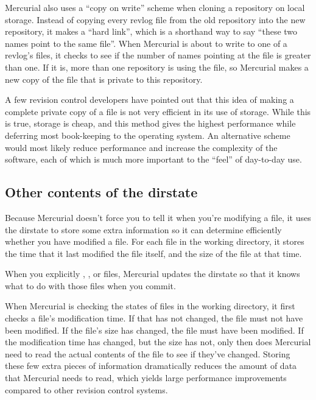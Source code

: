 Mercurial also uses a ``copy on write'' scheme when cloning a
repository on local storage.  Instead of copying every revlog file
from the old repository into the new repository, it makes a ``hard
link'', which is a shorthand way to say ``these two names point to the
same file''.  When Mercurial is about to write to one of a revlog's
files, it checks to see if the number of names pointing at the file is
greater than one.  If it is, more than one repository is using the
file, so Mercurial makes a new copy of the file that is private to
this repository.

A few revision control developers have pointed out that this idea of
making a complete private copy of a file is not very efficient in its
use of storage.  While this is true, storage is cheap, and this method
gives the highest performance while deferring most book-keeping to the
operating system.  An alternative scheme would most likely reduce
performance and increase the complexity of the software, each of which
is much more important to the ``feel'' of day-to-day use.

\subsection{Other contents of the dirstate}

Because Mercurial doesn't force you to tell it when you're modifying a
file, it uses the dirstate to store some extra information so it can
determine efficiently whether you have modified a file.  For each file
in the working directory, it stores the time that it last modified the
file itself, and the size of the file at that time.  

When you explicitly , ,  or
 files, Mercurial updates the dirstate so that it knows
what to do with those files when you commit.

When Mercurial is checking the states of files in the working
directory, it first checks a file's modification time.  If that has
not changed, the file must not have been modified.  If the file's size
has changed, the file must have been modified.  If the modification
time has changed, but the size has not, only then does Mercurial need
to read the actual contents of the file to see if they've changed.
Storing these few extra pieces of information dramatically reduces the
amount of data that Mercurial needs to read, which yields large
performance improvements compared to other revision control systems.

